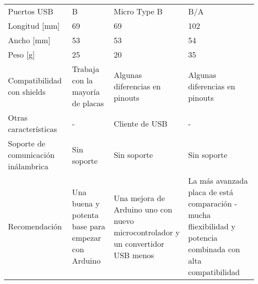 \begin{longtable}{|p{4.9cm}|p{3.3cm}|p{3.3cm}|p{3.3cm}|}
	Puertos USB                                 & B                                                 & Micro Type B                                                                    & B/A                                                                                                          \\
	Longitud [mm]                               & 69                                                & 69                                                                              & 102                                                                                                          \\
	Ancho [mm]                                  & 53                                                & 53                                                                              & 54                                                                                                           \\
	Peso [g]                                    & 25                                                & 20                                                                              & 35                                                                                                           \\
	Compatibilidad con shields                  & Trabaja con la mayoría de placas                  & Algunas diferencias en pinouts                                                  & Algunas diferencias en pinouts                                                                               \\
	Otras características                       & -                                                 & Cliente de USB                                                                  & -                                                                                                            \\
	Soporte de comunicación inálambrica         & Sin soporte                                       & Sin soporte                                                                     & Sin soporte                                                                                                  \\
	Recomendación                               & Una buena y potenta base para empezar con Arduino & Una mejora de Arduino uno con nuevo microcontrolador y un convertidor USB menos & La más avanzada placa de está comparación - mucha fliexibilidad y potencia combinada con alta compatibilidad \\
\end{longtable}